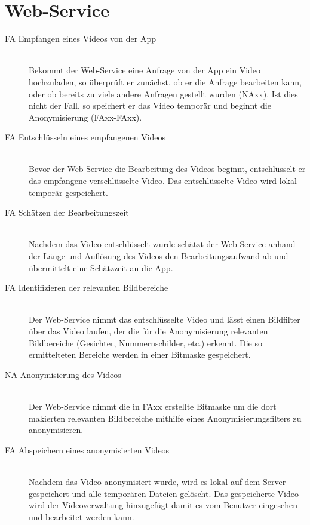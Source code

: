 \section{Web-Service}
\begin{description}
\item[FA Empfangen eines Videos von der App] \hfill \\
Bekommt der Web-Service eine Anfrage von der App ein Video hochzuladen, so überprüft er zunächst, ob er die Anfrage bearbeiten kann, oder ob bereits zu viele andere Anfragen gestellt wurden (NAxx). Ist dies nicht der Fall, so speichert er das Video temporär und beginnt die Anonymisierung (FAxx-FAxx).

\item[FA Entschlüsseln eines empfangenen Videos] \hfill \\
Bevor der Web-Service die Bearbeitung des Videos beginnt, entschlüsselt er das empfangene verschlüsselte Video. Das entschlüsselte Video wird lokal temporär gespeichert.

\item[FA Schätzen der Bearbeitungszeit] \hfill \\
Nachdem das Video entschlüsselt wurde schätzt der Web-Service anhand der Länge und Auflösung des Videos den Bearbeitungsaufwand  ab und übermittelt eine Schätzzeit an die App.

\item[FA Identifizieren der relevanten Bildbereiche] \hfill \\
Der Web-Service nimmt das entschlüsselte Video und lässt einen Bildfilter über das Video laufen, der die für die Anonymisierung relevanten Bildbereiche (Gesichter, Nummernschilder, etc.) erkennt. Die so ermittelteten Bereiche werden in einer Bitmaske gespeichert.

\item[NA Anonymisierung des Videos] \hfill \\
Der Web-Service nimmt die in FAxx erstellte Bitmaske um die dort makierten relevanten Bildbereiche mithilfe eines Anonymisierungsfilters zu anonymisieren.

\item[FA Abspeichern eines anonymisierten Videos] \hfill \\
Nachdem das Video anonymisiert wurde, wird es lokal auf dem Server gespeichert und alle temporären Dateien gelöscht. Das gespeicherte Video wird der Videoverwaltung hinzugefügt damit es vom Benutzer eingesehen und bearbeitet werden kann.
\end{description}

